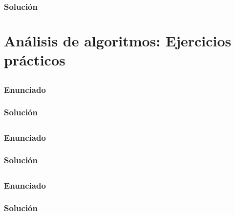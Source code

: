 \subsubsection{Solución}

\section{Análisis de algoritmos: Ejercicios prácticos}

\subsection{}\label{ej1-1-23}

\subsubsection{Enunciado}

\subsubsection{Solución}

\subsection{}\label{ej1-1-24}

\subsubsection{Enunciado}

\subsubsection{Solución}

\subsection{}\label{ej1-1-25}

\subsubsection{Enunciado}

\subsubsection{Solución}

\subsection{}\label{ej1-1-26}

